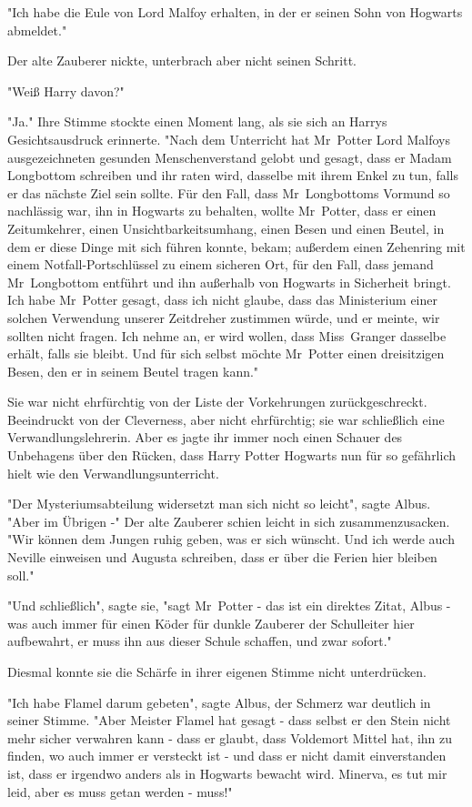 {"Ich habe die Eule von Lord Malfoy erhalten, in der er seinen Sohn von Hogwarts abmeldet."

Der alte Zauberer nickte, unterbrach aber nicht seinen Schritt.

"Weiß Harry davon?"

"Ja." Ihre Stimme stockte einen Moment lang, als sie sich an Harrys Gesichtsausdruck erinnerte. "Nach dem Unterricht hat Mr~Potter Lord Malfoys ausgezeichneten gesunden Menschenverstand gelobt und gesagt, dass er Madam Longbottom schreiben und ihr raten wird, dasselbe mit ihrem Enkel zu tun, falls er das nächste Ziel sein sollte. Für den Fall, dass Mr~Longbottoms Vormund so nachlässig war, ihn in Hogwarts zu behalten, wollte Mr~Potter, dass er einen Zeitumkehrer, einen Unsichtbarkeitsumhang, einen Besen und einen Beutel, in dem er diese Dinge mit sich führen konnte, bekam; außerdem einen Zehenring mit einem Notfall-Portschlüssel zu einem sicheren Ort, für den Fall, dass jemand Mr~Longbottom entführt und ihn außerhalb von Hogwarts in Sicherheit bringt. Ich habe Mr~Potter gesagt, dass ich nicht glaube, dass das Ministerium einer solchen Verwendung unserer Zeitdreher zustimmen würde, und er meinte, wir sollten nicht fragen. Ich nehme an, er wird wollen, dass Miss~Granger dasselbe erhält, falls sie bleibt. Und für sich selbst möchte Mr~Potter einen dreisitzigen Besen, den er in seinem Beutel tragen kann."

Sie war nicht ehrfürchtig von der Liste der Vorkehrungen zurückgeschreckt. Beeindruckt von der Cleverness, aber nicht ehrfürchtig; sie war schließlich eine Verwandlungslehrerin. Aber es jagte ihr immer noch einen Schauer des Unbehagens über den Rücken, dass Harry Potter Hogwarts nun für so gefährlich hielt wie den Verwandlungsunterricht.

"Der Mysteriumsabteilung widersetzt man sich nicht so leicht", sagte Albus. "Aber im Übrigen -" Der alte Zauberer schien leicht in sich zusammenzusacken. "Wir können dem Jungen ruhig geben, was er sich wünscht. Und ich werde auch Neville einweisen und Augusta schreiben, dass er über die Ferien hier bleiben soll."

"Und schließlich", sagte sie, "sagt Mr~Potter - das ist ein direktes Zitat, Albus - was auch immer für einen Köder für dunkle Zauberer der Schulleiter hier aufbewahrt, er muss ihn aus dieser Schule schaffen, und zwar sofort."

Diesmal konnte sie die Schärfe in ihrer eigenen Stimme nicht unterdrücken.

"Ich habe Flamel darum gebeten", sagte Albus, der Schmerz war deutlich in seiner Stimme. "Aber Meister Flamel hat gesagt - dass selbst er den Stein nicht mehr sicher verwahren kann - dass er glaubt, dass Voldemort Mittel hat, ihn zu finden, wo auch immer er versteckt ist - und dass er nicht damit einverstanden ist, dass er irgendwo anders als in Hogwarts bewacht wird. Minerva, es tut mir leid, aber es muss getan werden - muss!"

}
